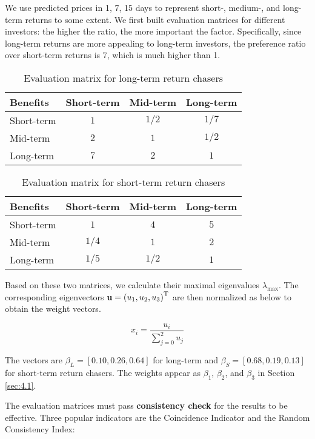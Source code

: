 \documentclass{mcmthesis}
\begin{document}
	We use predicted prices in 1, 7, 15 days to represent short-, medium-, and long-term returns to some extent. We first built evaluation matrices for different investors: the higher the ratio, the more important the factor. Specifically, since long-term returns are more appealing to long-term investors, the preference ratio over short-term returns is 7, which is much higher than 1. 
	
	\begin{table}[h]
		\centering
		\begin{tabular}{lccc}
			\toprule
			Benefits   & Short-term & Mid-term & Long-term \\ \midrule
			Short-term & $1$ & $1/2$ & $1/7$ \\
			Mid-term   & $2$ & $1$ & $1/2$ \\
			Long-term  & $7$ & $2$ & $1$ \\ \bottomrule
		\end{tabular}
		\caption{Evaluation matrix for long-term return chasers}
	\end{table}
	
	\begin{table}[h]
		\centering
		\begin{tabular}{lccc}
			\toprule
			Benefits   & Short-term & Mid-term & Long-term \\ \midrule
			Short-term & $1$ & $4$ & $5$ \\
			Mid-term   & $1/4$ & $1$ & $2$ \\
			Long-term  & $1/5$ & $1/2$ & $1$ \\ \bottomrule
		\end{tabular}
		\caption{Evaluation matrix for short-term return chasers}
	\end{table}
	
	Based on these two matrices, we calculate their maximal eigenvalues $\lambda_{\max}$. The corresponding eigenvectors $\textbf{\textrm{u}}=\left(u_{1}, u_{2}, u_{3}\right)^{\textrm{T}}$ are then normalized as below to obtain the weight vectors. 
	
	$$x_{i}=\frac{u_{i}}{\sum_{j=0}^{2} u_{j}}$$
	
	The vectors are $\beta_L = [0.10, 0.26, 0.64]$ for long-term and $\beta_S = [0.68, 0.19, 0.13]$ for short-term return chasers. The weights appear as $\beta_1$, $\beta_2$, and $\beta_3$ in Section \ref{sec:4.1}. 
	
	The evaluation matrices must pass \textbf{consistency check} for the results to be effective. Three popular indicators are the Coincidence Indicator and the Random Consistency Index: 
	
\end{document}
